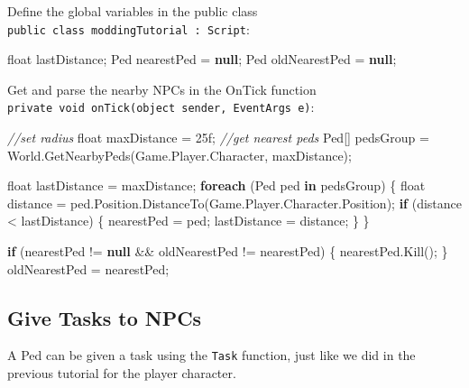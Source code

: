 \documentclass[
  openany]{book}
\newenvironment{Shaded}{\begin{snugshade}}{\end{snugshade}}
\newcommand{\CommentTok}[1]{\textcolor[rgb]{0.56,0.35,0.01}{\textit{#1}}}
\newcommand{\DataTypeTok}[1]{\textcolor[rgb]{0.13,0.29,0.53}{#1}}
\newcommand{\FunctionTok}[1]{\textcolor[rgb]{0.00,0.00,0.00}{#1}}
\newcommand{\KeywordTok}[1]{\textcolor[rgb]{0.13,0.29,0.53}{\textbf{#1}}}
\newcommand{\NormalTok}[1]{#1}
\begin{document}
Define the global variables in the public class \texttt{public\ class\ moddingTutorial\ :\ Script}:

\begin{Shaded}
\begin{Highlighting}[]
\DataTypeTok{float}\NormalTok{ lastDistance;}
\NormalTok{Ped nearestPed = }\KeywordTok{null}\NormalTok{;}
\NormalTok{Ped oldNearestPed = }\KeywordTok{null}\NormalTok{;}
\end{Highlighting}
\end{Shaded}

Get and parse the nearby NPCs in the OnTick function \texttt{private\ void\ onTick(object\ sender,\ EventArgs\ e)}:

\begin{Shaded}
\begin{Highlighting}[]
\CommentTok{//set radius}
\DataTypeTok{float}\NormalTok{ maxDistance = 25f;}
\CommentTok{//get nearest peds      }
\NormalTok{Ped[] pedsGroup = World.}\FunctionTok{GetNearbyPeds}\NormalTok{(Game.}\FunctionTok{Player}\NormalTok{.}\FunctionTok{Character}\NormalTok{, maxDistance);}
 
\DataTypeTok{float}\NormalTok{ lastDistance = maxDistance;}
\KeywordTok{foreach}\NormalTok{ (Ped ped }\KeywordTok{in}\NormalTok{ pedsGroup)}
\NormalTok{\{}
    \DataTypeTok{float}\NormalTok{ distance = ped.}\FunctionTok{Position}\NormalTok{.}\FunctionTok{DistanceTo}\NormalTok{(Game.}\FunctionTok{Player}\NormalTok{.}\FunctionTok{Character}\NormalTok{.}\FunctionTok{Position}\NormalTok{);}
    \KeywordTok{if}\NormalTok{ (distance < lastDistance)}
\NormalTok{    \{}
\NormalTok{        nearestPed = ped;}
\NormalTok{        lastDistance = distance;}
\NormalTok{    \}}
\NormalTok{\}}

    \KeywordTok{if}\NormalTok{ (nearestPed != }\KeywordTok{null}\NormalTok{ && oldNearestPed != nearestPed)}
\NormalTok{    \{}
\NormalTok{        nearestPed.}\FunctionTok{Kill}\NormalTok{();}
\NormalTok{    \}}
\NormalTok{oldNearestPed = nearestPed;}
\end{Highlighting}
\end{Shaded}

\hypertarget{give-tasks-to-npcs}{%
\subsection*{Give Tasks to NPCs}\label{give-tasks-to-npcs}}

A Ped can be given a task using the \texttt{Task} function, just like we did in the previous tutorial for the player character.
\end{document}
